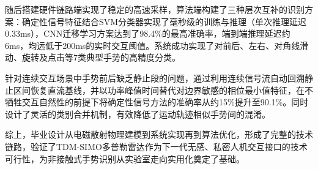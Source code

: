 随后搭建硬件链路端实现了稳定的高速采样，算法端构建了三种层次互补的识别方案：确定性信号特征结合SVM分类器实现了毫秒级的训练与推理（单次推理延迟0.33ms），CNN迁移学习方案达到了98.4\%的最高准确率，端到端推理延迟约6ms，均远低于200ms的实时交互阈值。系统成功实现了对前后、左右、对角线滑动、旋转及点击等7类典型手势的高精度分类。

针对连续交互场景中手势前后缺乏静止段的问题，通过利用连续信号流自动回溯静止区间恢复直流基线，并以功率峰值时间替代对边界敏感的相位最小值特征，在不牺牲交互自然性的前提下将确定性信号方法的准确率从约15\%提升至90.1\%。同时设计了灵活的类别合并机制，有效降低了运动轨迹相似手势间的混淆。

综上，毕业设计从电磁散射物理建模到系统实现再到算法优化，形成了完整的技术链路，验证了TDM-SIMO多普勒雷达作为下一代无感、私密人机交互接口的技术可行性，为非接触式手势识别从实验室走向实用化奠定了基础。
